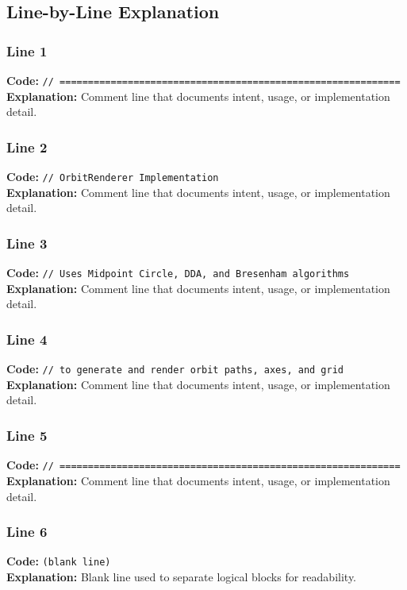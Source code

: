\documentclass[11pt,a4paper]{article}
\begin{document}
\subsection{Line-by-Line Explanation}
\subsubsection*{Line 1}
\textbf{Code:} \verb|// ============================================================|\\
\textbf{Explanation:} Comment line that documents intent, usage, or implementation detail.

\subsubsection*{Line 2}
\textbf{Code:} \verb|// OrbitRenderer Implementation|\\
\textbf{Explanation:} Comment line that documents intent, usage, or implementation detail.

\subsubsection*{Line 3}
\textbf{Code:} \verb|// Uses Midpoint Circle, DDA, and Bresenham algorithms|\\
\textbf{Explanation:} Comment line that documents intent, usage, or implementation detail.

\subsubsection*{Line 4}
\textbf{Code:} \verb|// to generate and render orbit paths, axes, and grid|\\
\textbf{Explanation:} Comment line that documents intent, usage, or implementation detail.

\subsubsection*{Line 5}
\textbf{Code:} \verb|// ============================================================|\\
\textbf{Explanation:} Comment line that documents intent, usage, or implementation detail.

\subsubsection*{Line 6}
\textbf{Code:} \texttt{(blank line)}\\
\textbf{Explanation:} Blank line used to separate logical blocks for readability.
\end{document}
